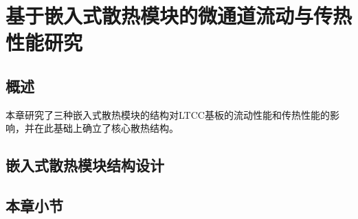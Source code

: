 
\chapter{基于嵌入式散热模块的微通道流动与传热性能研究}\label{ch:3}
\section{概述}
本章研究了三种嵌入式散热模块的结构对LTCC基板的流动性能和传热性能的影响，并在此基础上确立了核心散热结构。

\section{嵌入式散热模块结构设计}\label{sec:embed}

\section{本章小节}